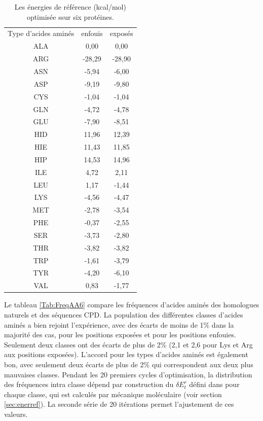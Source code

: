     \begin{table}[!htbp]
      \centering
      \caption{Les énergies de référence (kcal/mol) optimisée ssur six protéines.}
      \begin{tabular}{ccc}

        \toprule
        Type d'acides aminés & enfouis & exposés \\
        \cmidrule{1-3}

        ALA & 0,00     &  0,00     \\
        ARG & -28,29   &  -28,90   \\
        ASN & -5,94    &  -6,00    \\
        ASP & -9,19    &  -9,80    \\
        CYS & -1,04    &  -1,04    \\
        GLN & -4,72    &  -4,78    \\
        GLU & -7,90    &  -8,51    \\
        HID & 11,96    &  12,39    \\
        HIE & 11,43    &  11,85    \\
        HIP & 14,53    &  14,96    \\
        ILE & 4,72     &  2,11     \\
        LEU & 1,17     &  -1,44    \\
        LYS & -4,56    &  -4,47    \\
        MET & -2,78    &  -3,54    \\
        PHE & -0,37    &  -2,55    \\
        SER & -3,73    &  -2,80    \\
        THR & -3,82    &  -3,82    \\
        TRP & -1,61    &  -3,79    \\
        TYR & -4,20    &  -6,10    \\
        VAL & 0,83     &  -1,77    \\

        \bottomrule
      \end{tabular}      

\label{tab:RefEner6}      
    \end{table}

Le tableau \ref{Tab:FreqAA6} compare les fréquences d'acides aminés des homologues naturels et des séquences CPD. La population des différentes classes d'acides aminés a bien rejoint l'expérience, avec des écarts de moins de 1\% dans la majorité des cas, pour les positions exposées et pour les positions enfouies. Seulement deux classes ont des écarts de plus de 2\% (2,1 et 2,6 pour Lys et Arg aux positions exposées). L'accord pour les types d'acides aminés est également bon, avec seulement deux écarts de plus de 2\% qui correspondent aux deux plus mauvaises classes. Pendant les 20 premiers cycles d'optimisation, la distribution des fréquences intra classe dépend par construction du $\delta E_t^r$ défini dans pour chaque classe, qui est calculés par mécanique moléculaire (voir section \ref{sec:enerref}). La seconde série de 20 itérations permet l'ajustement de ces valeurs. 
    
